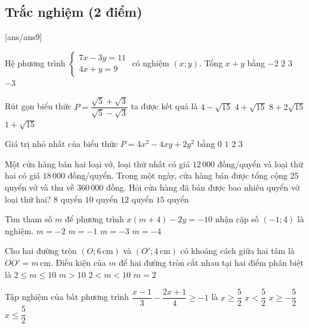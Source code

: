 \setcounter{ex}{0} 
\subsection{Trắc nghiệm (2 điểm)}
[ans/ans9] 


\begin{ex}
Hệ phương trình
$\begin{cases}
7x-3y=11\\
4x+y=9
\end{cases}$
có nghiệm $(x;y)$. Tổng $x+y$ bằng
\vspace{0.2cm}
\choice
{$-2$}
{$2$}
{\True $3$}
{$-3$}
\end{ex}

\begin{ex}
Rút gọn biểu thức
$P=\dfrac{\sqrt{5}+\sqrt{3}}{\sqrt{5}-\sqrt{3}}$
ta được kết quả là
\vspace{0.15cm}
\choice
{$4-\sqrt{15}$}
{\True $4+\sqrt{15}$}
{$8+2\sqrt{15}$}
{$1+\sqrt{15}$}
\end{ex}

\begin{ex}
Giá trị nhỏ nhất của biểu thức $P=4x^2-4xy+2y^2$ bằng
\choice
{\True $0$}
{$1$}
{$2$}
{$3$}
\end{ex}

\begin{ex}
Một cửa hàng bán hai loại vở, loại thứ nhất có giá $12\,000$ đồng/quyển và loại thứ hai có giá $18\,000$ đồng/quyển. Trong một ngày, cửa hàng bán được tổng cộng $25$ quyển vở và thu về $360\,000$ đồng. Hỏi cửa hàng đã bán được bao nhiêu quyển vở loại thứ hai?
\choice
{$8$ quyển}
{\True $10$ quyển}
{$12$ quyển}
{$15$ quyển}
\end{ex}

\begin{ex}
Tìm tham số $m$ để phương trình $x(m+4)-2y=-10$ nhận cặp số $(-1;4)$ là nghiệm.
\choice
{\True $m=-2$}
{$m=-1$}
{$m=-3$}
{$m=-4$}
\end{ex}

\begin{ex}
Cho hai đường tròn $(O;6\,\text{cm})$ và $(O';4\,\text{cm})$ có khoảng cách giữa hai tâm là $OO'=m\,\text{cm}$. Điều kiện của $m$ để hai đường tròn cắt nhau tại hai điểm phân biệt là
\choice
{$2\le m\le 10$}
{$m>10$}
{\True $2<m<10$}
{$m=2$}
\end{ex}

\begin{ex}
Tập nghiệm của bất phương trình
$\dfrac{x-1}{3}-\dfrac{2x+1}{4}\ge -1$
là
\choice
{$x\ge\dfrac{5}{2}$}
{$x<\dfrac{5}{2}$}
{$x\ge-\dfrac{5}{2}$}
{\True $x\le\dfrac{5}{2}$}
\end{ex}

